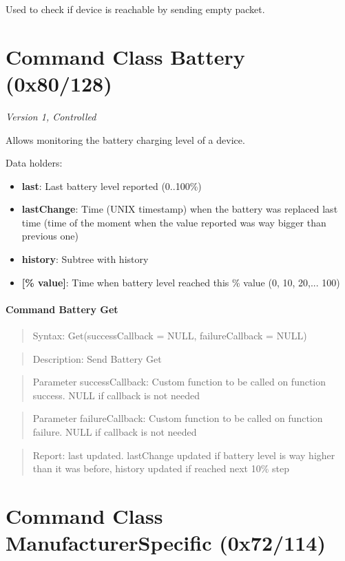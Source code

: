 Used to check if device is reachable by sending empty packet.

\section{Command Class Battery (0x80/128)}

\textit{Version 1, Controlled}
\newline

Allows monitoring the battery charging level of a device.
\newline

\noindent
Data holders:

\begin{itemize}
\item \textbf{last}: Last battery level reported (0..100\%)
\item \textbf{lastChange}: Time (UNIX timestamp) when the battery was replaced last time (time of the moment when the value reported was way bigger than previous one)
\item \textbf{history}: Subtree with history
\item \qquad\textbf{[\% value]}: Time when battery level reached this \% value (0, 10, 20,... 100)
\end{itemize}

\paragraph{Command Battery Get}
\begin{quote}Syntax: Get(successCallback = NULL, failureCallback = NULL)\end{quote}
\begin{quote}Description: Send Battery Get\end{quote}
\begin{quote}Parameter successCallback: Custom function to be called on function success. NULL if callback is not needed\end{quote}
\begin{quote}Parameter failureCallback: Custom function to be called on function failure. NULL if callback is not needed\end{quote}
\begin{quote}Report: last updated. lastChange updated if battery level is way higher than it was before, history updated if reached next 10\% step\end{quote}


\section{Command Class ManufacturerSpecific (0x72/114)}

